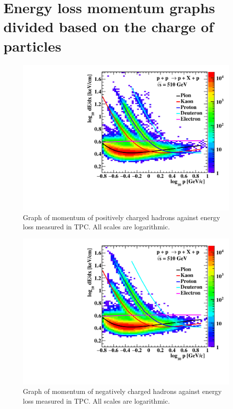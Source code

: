\chapter{Energy loss momentum graphs divided based on the charge of particles}
\label{appendixA}

\FloatBarrier
\begin{figure}[ht]
    \centering
    \includegraphics[width=1\textwidth]{figures/dEdxPlus.pdf}
    \caption[Graph of momentum of positively charged hadrons against energy loss from TPC]{Graph of momentum of positively charged hadrons against energy loss measured in TPC. All scales are logarithmic.}
    \label{af18}
\end{figure}
\FloatBarrier

\FloatBarrier
\begin{figure}[ht]
    \centering
    \includegraphics[width=1\textwidth]{figures/dEdxMinus.pdf}
    \caption[Graph of momentum of negatively charged hadrons against energy loss from TPC]{Graph of momentum of negatively charged hadrons against energy loss measured in TPC. All scales are logarithmic.}
    \label{af32}
\end{figure}
\FloatBarrier
